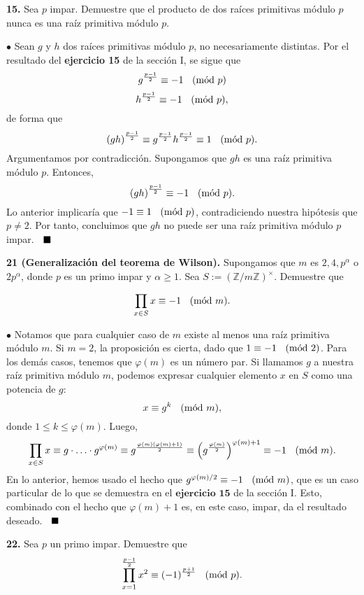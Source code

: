 \documentclass{article}
\newcommand{\Mod}[1]{\ \hspace{0.2cm} (\mathrm{m\acute{o}d}\ #1)}
\begin{document}
\begin{mybox}
	\textbf{15. } Sea $p$ impar. Demuestre que el producto de dos raíces primitivas módulo $p$ nunca es una raíz primitiva módulo $p$.
\end{mybox}	
$\bullet$ Sean $g$ y $h$ dos raíces primitivas módulo $p$, no necesariamente distintas. Por el resultado del \textbf{ejercicio 15} de la sección I, se sigue que 
$$ g^{\frac{p-1}{2}}  \equiv -1 \Mod{p}$$
$$ h^{\frac{p-1}{2}}  \equiv -1 \Mod{p},$$
de forma que 
$$ \left( gh \right)^{\frac{p-1}{2}} \equiv g^{\frac{p-1}{2}} h^{\frac{p-1}{2}} \equiv 1 \Mod{p}. $$
Argumentamos por contradicción. Supongamos que $gh$ es una raíz primitiva módulo $p$. Entonces,
$$ \left( gh \right)^{\frac{p-1}{2}} \equiv -1 \Mod{p}. $$
Lo anterior implicaría que $-1 \equiv 1 \Mod{p}$, contradiciendo nuestra hipótesis que $p \neq 2.$ Por tanto, concluimos que $gh$ no puede ser una raíz primitiva módulo $p$ impar. $\hspace{0.2cm} \blacksquare$
 
 \newpage
 
\begin{mybox}
	\textbf{21 (Generalización del teorema de Wilson). }  Supongamos que $m$ es $2, 4, p^{\alpha}$ o $2p^{\alpha}$, donde $p$ es un primo impar y $\alpha \geq 1.$ Sea $S := (\mathbb{Z}/ m\mathbb{Z})^{\times}$. Demuestre que
	
	$$ \prod_{x \in S} x \equiv -1 \Mod{m}. $$
\end{mybox}	
$\bullet$  Notamos que para cualquier caso de $m$ existe al menos una raíz primitiva módulo $m$.
Si $m = 2$, la proposición es cierta, dado que $1 \equiv -1 \Mod{2}$. Para los demás casos, tenemos que $\varphi(m)$ es un número par. Si llamamos $g$ a nuestra raíz primitiva módulo $m$, podemos expresar cualquier elemento $x$ en $S$ como una potencia de $g$:
$$ x \equiv g^{k} \Mod{m},$$
donde $1 \leq k \leq \varphi(m)$. Luego, 
$$ \prod_{x \in S} x \equiv g \cdot \ldots \cdot  g^{\varphi(m)} \equiv g^{\frac{\varphi(m)(\varphi(m) + 1)}{2}} \equiv \left( g^{\frac{\varphi(m)}{2}} \right)^{\varphi(m) + 1} \equiv -1 \Mod{m}.  $$
En lo anterior,  hemos usado el hecho que $g^{\varphi(m)/2} \equiv -1 \Mod{m}$, que es un caso particular de lo que se demuestra en el $\textbf{ejercicio 15}$ de la sección I. Esto, combinado con el hecho que $\varphi(m) + 1$ es, en este caso, impar, da el resultado deseado. $\hspace{0.2cm} \blacksquare$

\newpage
\begin{mybox}
\textbf{22.} Sea $p$ un primo impar. Demuestre que 
$$ \prod_{x=1}^{\frac{p-1}{2}} x^2 \equiv (-1)^{\frac{p+1}{2}} \Mod{p} .$$
\end{mybox}	
\end{document}
